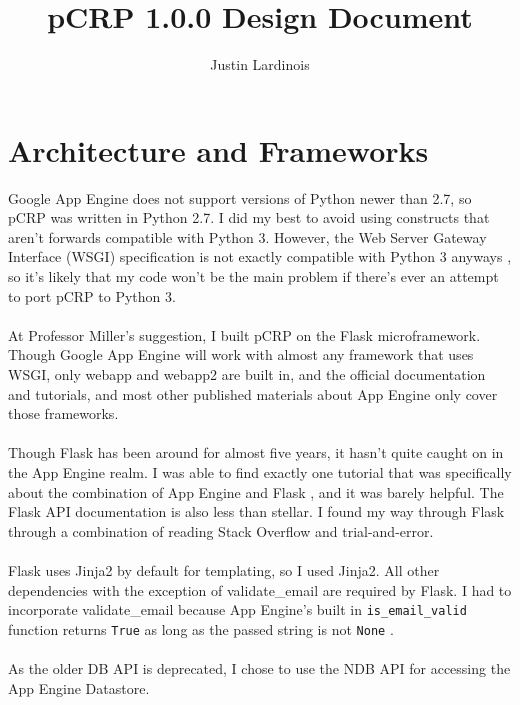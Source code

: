 \documentclass[12pt]{article}
\title{pCRP 1.0.0 Design Document}
\author{Justin Lardinois}
\date{}
\begin{document}
\maketitle

\section{Architecture and Frameworks}
	Google App Engine does not support versions of Python newer than 2.7, so
	pCRP was written in Python 2.7. I did my best to avoid using constructs
	that aren't forwards compatible with Python 3. However, the Web Server
	Gateway Interface (WSGI) specification is not exactly compatible with
	Python 3 anyways \cite{python3}, so it's likely that my code won't be
	the main problem if there's ever an attempt to port pCRP to Python 3.
	\\\\
	At Professor Miller's suggestion, I built pCRP on the Flask
	microframework. Though Google App Engine will work with almost any
	framework that uses WSGI, only webapp and webapp2 are built in, and
	the official documentation and tutorials, and most other published
	materials about App Engine only cover those frameworks.
	\\\\
	Though Flask has been around for almost five years, it hasn't quite
	caught on in the App Engine realm. I was able to find exactly one
	tutorial that was specifically about the combination of App Engine
	and Flask \cite{souza}, and it was barely helpful. The Flask API
	documentation \cite{flask} is also less than stellar. I found my
	way through Flask through a combination of reading Stack Overflow
	and trial-and-error.
	\\\\
	Flask uses Jinja2 by default for templating, so I used Jinja2. All
	other dependencies with the exception of validate{\_}email are required
	by Flask. I had to incorporate validate{\_}email because App Engine's
	built in \texttt{is{\_}email{\_}valid} function returns \texttt{True} as
	long as the passed string is not \texttt{None} \cite{email}.
	\\\\
	As the older DB API is deprecated, I chose to use the NDB API for
	accessing the App Engine Datastore.
\end{document}
